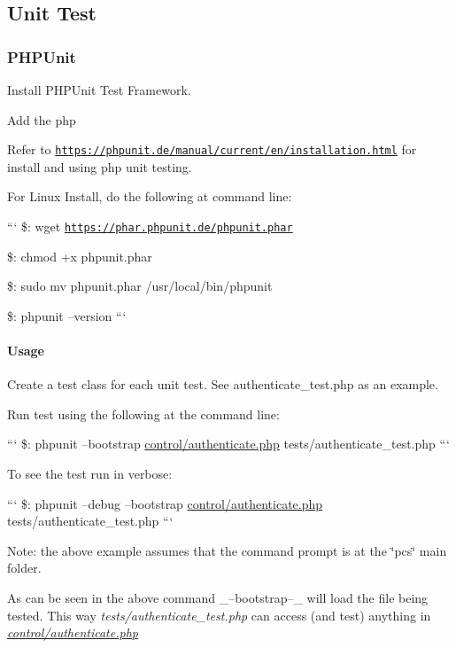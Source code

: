\subsection*{Unit Test}





\subsubsection*{P\-H\-P\-Unit}

Install P\-H\-P\-Unit Test Framework.

Add the php

Refer to \href{https://phpunit.de/manual/current/en/installation.html}{\tt https\-://phpunit.\-de/manual/current/en/installation.\-html} for install and using php unit testing.

For Linux Install, do the following at command line\-:

``` \$\-: wget \href{https://phar.phpunit.de/phpunit.phar}{\tt https\-://phar.\-phpunit.\-de/phpunit.\-phar}

\$\-: chmod +x phpunit.\-phar

\$\-: sudo mv phpunit.\-phar /usr/local/bin/phpunit

\$\-: phpunit --version ```

\paragraph*{Usage}

Create a test class for each unit test. See authenticate\-\_\-test.\-php as an example.

Run test using the following at the command line\-:

``` \$\-: phpunit --bootstrap \hyperlink{authenticate_8php}{control/authenticate.\-php} tests/authenticate\-\_\-test.\-php ```

To see the test run in verbose\-:

``` \$\-: phpunit --debug --bootstrap \hyperlink{authenticate_8php}{control/authenticate.\-php} tests/authenticate\-\_\-test.\-php ```

Note\-: the above example assumes that the command prompt is at the \char`\"{}pcs\char`\"{} main folder.

As can be seen in the above command \-\_\---bootstrap--\-\_\- will load the file being tested. This way {\itshape tests/authenticate\-\_\-test.\-php} can access (and test) anything in {\itshape \hyperlink{authenticate_8php}{control/authenticate.\-php}}

